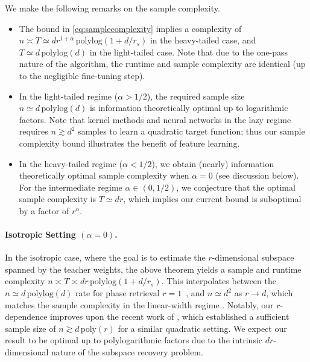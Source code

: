 \begin{remark}
We make the following remarks on the sample complexity. 
\begin{itemize}[leftmargin=*]
    \item The bound in \eqref{eq:samplecomplexity} implies a complexity of  $n\asymp T \! \simeq \!  d r^{1+\alpha} \, \mathrm{polylog}(1 + d / r_s)$  in the heavy-tailed case, and $T \simeq d \, \mathrm{polylog}(d)$ in the light-tailed case. Note that due to the one-pass nature of the algorithm, the runtime and sample complexity are identical (up to the negligible fine-tuning step). 
    \item In the light-tailed regime ($\alpha > 1/2$), the required sample size $n \simeq d \, \mathrm{polylog}(d)$ is information theoretically optimal up to logarithmic factors. Note that kernel methods and neural networks in the lazy regime \cite{jacot2018neural,chizat2018note} requires $n\gtrsim d^2$ samples to learn a quadratic target function; thus our sample complexity bound illustrates the benefit of feature learning. 
    \item In the heavy-tailed regime ($\alpha<1/2$), we obtain (nearly) information theoretically optimal sample complexity when $\alpha=0$ (see discussion below). For the intermediate regime $\alpha\in (0,1/2)$, we conjecture that the optimal sample complexity is $T \simeq d r$, which implies our current bound is suboptimal by a factor of $r^{\alpha}$. 
\end{itemize}
\end{remark}

\paragraph{Isotropic Setting $(\alpha=0)$.} 
In the isotropic case, where the goal is to estimate the $r$-dimensional subspace spanned by the teacher weights, the above theorem yields a sample and runtime complexity $n\asymp T \asymp d r \, \mathrm{polylog}(1 + d / r_s)$. This interpolates between the $n \simeq d \, \mathrm{polylog}(d)$ rate for phase retrieval $r = 1$~\cite{tan2019online,benarous2021online}, and $n \simeq d^2$  as $r \to d$, which matches the sample complexity in the linear-width regime \cite{maillard2024bayes,erba2025nuclear}. 
Notably, our $r$-dependence improves upon the recent work of \cite{ren2024learning}, which established a sufficient sample size of $n \gtrsim d \, \mathrm{poly}(r)$ for a similar quadratic setting.  
We expect our result to be optimal up to polylogarithmic factors due to the intrinsic $dr$-dimensional nature of the subspace recovery problem.


